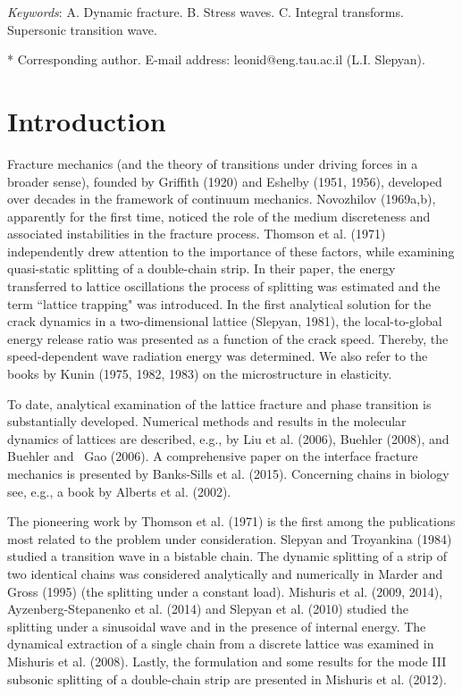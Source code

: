 \documentclass[12pt]{article}
\begin{document}
\vspace{10mm}\noindent
{\em Keywords}: A. Dynamic fracture. B. Stress waves. C. Integral transforms. Supersonic transition wave.

\vspace{10mm}\noindent
* Corresponding author. E-mail address: leonid@eng.tau.ac.il (L.I. Slepyan).



\section{Introduction}
Fracture mechanics (and the theory of transitions under driving forces in a broader sense), founded by Griffith (1920) and Eshelby (1951, 1956), developed over decades in the framework of continuum mechanics. Novozhilov (1969a,b), apparently for the first time, noticed the role of the medium discreteness and associated instabilities in the fracture process.
Thomson et al. (1971) independently drew attention to the importance of these factors, while examining quasi-static splitting of a double-chain strip. In their paper, the energy transferred to lattice oscillations the process of splitting was estimated and the term ``lattice trapping" was introduced. In the first analytical solution for the crack dynamics in a two-dimensional lattice (Slepyan, 1981), the local-to-global energy release ratio was presented as a function of the crack speed. Thereby, the speed-dependent wave radiation energy was determined. We also refer to the books by Kunin (1975, 1982, 1983) on the microstructure in elasticity.

To date, analytical examination of the lattice fracture and phase transition is substantially developed. Numerical methods and results in the molecular dynamics of lattices are described, e.g., by Liu et al. (2006), Buehler (2008), and Buehler and  Gao (2006). A comprehensive paper on the interface fracture mechanics is presented by Banks-Sills et al. (2015). Concerning chains in biology see, e.g., a book by Alberts et al. (2002).

The pioneering work by Thomson et al. (1971) is the first among the publications most related to the problem under consideration.  Slepyan and Troyankina (1984) studied a transition wave in a bistable chain. The dynamic splitting of a strip of two identical chains was considered analytically and numerically in Marder and Gross (1995) (the splitting under a constant load).  Mishuris et al. (2009, 2014), Ayzenberg-Stepanenko et al. (2014) and Slepyan et al. (2010) studied the splitting under a sinusoidal wave and in the presence of internal energy. The dynamical extraction of a single chain from a discrete lattice was examined in Mishuris et al. (2008). Lastly, the formulation and some results for the mode III subsonic splitting of a double-chain strip are presented in Mishuris et al. (2012).
\end{document}
